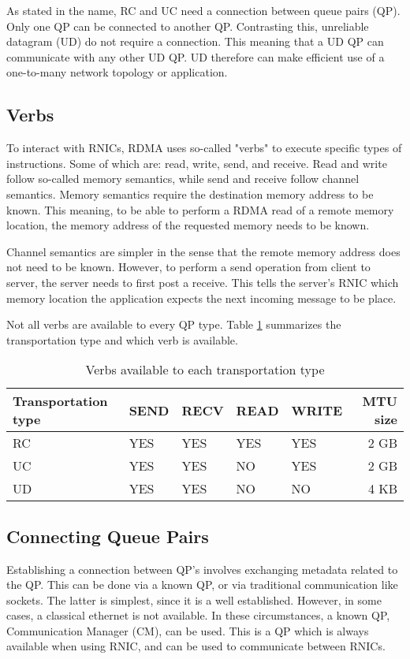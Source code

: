 As stated in the name, RC and UC need a connection between queue pairs (QP).
Only one QP can be connected to another QP.
Contrasting this, unreliable datagram (UD) do not require a connection.
This meaning that a UD QP can communicate with any other UD QP.
UD therefore can make efficient use of a one-to-many network topology or application.

\subsection{Verbs}\label{subsec:verbs}
To interact with RNICs, RDMA uses so-called "verbs" to execute specific types of instructions.
Some of which are: read, write, send, and receive.
Read and write follow so-called memory semantics, while send and receive follow channel semantics.
Memory semantics require the destination memory address to be known.
This meaning, to be able to perform a RDMA read of a remote memory location, the memory address of the requested memory needs to be known.

Channel semantics are simpler in the sense that the remote memory address does not need to be known.
However, to perform a send operation from client to server, the server needs to first post a receive.
This tells the server's RNIC which memory location the application expects the next incoming message to be place.

Not all verbs are available to every QP type. Table \ref{tab:transport-verb} summarizes the transportation type and which verb is available.
\begin{table}
    \centering
    \begin{tabular}{lllllr}
        \toprule
        \textbf{Transportation type} & \textbf{SEND} & \textbf{RECV} & \textbf{READ} & \textbf{WRITE} & \textbf{MTU size} \\
        \midrule
        RC & YES & YES & YES & YES & 2 GB \\
        UC & YES & YES & NO & YES & 2 GB \\
        UD & YES & YES & NO & NO & 4 KB \\
        \bottomrule
    \end{tabular}
    \caption{Verbs available to each transportation type}
    \label{tab:transport-verb}
\end{table}

\subsection{Connecting Queue Pairs}\label{subsec:connecting-qp's}
Establishing a connection between QP's involves exchanging metadata related to the QP.
This can be done via a known QP, or via traditional communication like sockets.
The latter is simplest, since it is a well established.
However, in some cases, a classical ethernet is not available.
In these circumstances, a known QP, Communication Manager (CM), can be used.
This is a QP which is always available when using RNIC, and can be used to communicate between RNICs.

